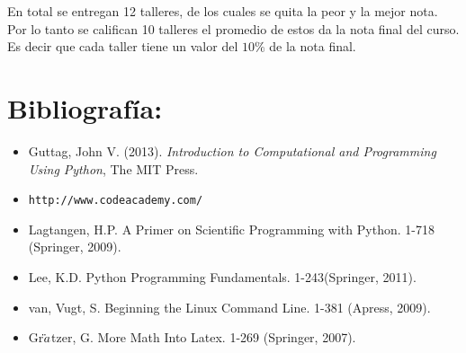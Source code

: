 \documentclass[letterpaper]{article}
\begin{document}
En total se entregan 12 talleres, de los cuales se quita la peor y la mejor nota. 
Por lo tanto se califican 10 talleres el promedio de estos da la nota final del curso. Es decir que 
cada taller tiene un valor del $10\%$ de la nota final.

\section*{Bibliograf\'ia:}
\begin{itemize}
\item Guttag, John V. (2013). \textit{Introduction to Computational and Programming Using Python}, The MIT Press.
\item \verb"http://www.codeacademy.com/"
\item Lagtangen, H.P. A Primer on Scientific Programming with Python. 1-718 (Springer, 2009).
\item Lee, K.D. Python Programming Fundamentals. 1-243(Springer, 2011).
\item van, Vugt, S. Beginning the Linux Command Line. 1-381 (Apress, 2009).
\item Gr$\ddot \rm{a}$tzer, G. More Math Into Latex. 1-269 (Springer, 2007).
\end{itemize}
\end{document}
